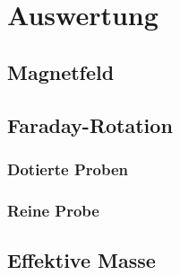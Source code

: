 \section{Auswertung}
\label{sec:auswertung}

\subsection{Magnetfeld}

\subsection{Faraday-Rotation}

\subsubsection{Dotierte Proben}

\subsubsection{Reine Probe}

\subsection{Effektive Masse}
